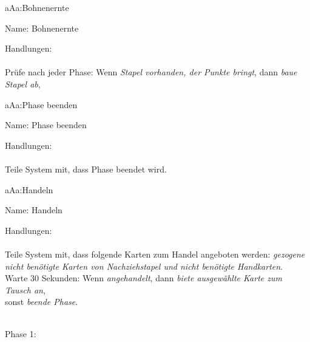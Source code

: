 \begin{description}[leftmargin=5em, style=sameline]
	\begin{lhp}{a}{A}{a:Bohnenernte}
		\item [Name:] Bohnenernte 
		\item [Handlungen:]\hfill\\ 
		\\Prüfe nach jeder Phase: Wenn {\itshape Stapel vorhanden, der Punkte bringt}, dann 
		{\itshape baue Stapel ab},\\		
	\end{lhp}
	
	\begin{lhp}{a}{A}{a:Phase beenden}
		\item [Name:] Phase beenden
		\item [Handlungen:]\hfill\\ 
		\\Teile System mit, dass Phase beendet wird.
	\end{lhp}

	\begin{lhp}{a}{A}{a:Handeln}
		\item [Name:] Handeln
		\item [Handlungen:]\hfill\\ 
		\\Teile System mit, dass folgende Karten zum Handel angeboten werden: {\itshape gezogene nicht benötigte Karten von Nachziehstapel und nicht benötigte Handkarten}.
		\\Warte 30 Sekunden:
		Wenn {\itshape angehandelt}, dann {\itshape biete ausgewählte Karte zum Tausch an}, 
		\\sonst {\itshape beende Phase}.
	\end{lhp}
	
\end{description}


\hfill\\ Phase 1:\\


